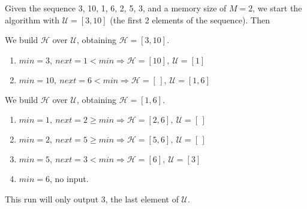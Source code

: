 Given the sequence 3, 10, 1, 6, 2, 5, 3, and a memory size of $M = 2$, we start
the algorithm with $\mathcal{U} = [3, 10]$ (the first 2 elements of the
sequence). Then
%
\begin{description}[labelindent=0.5cm]

  \item[Run 1.] We build $\mathcal{H}$ over $\mathcal{U}$, obtaining
  $\mathcal{H} = [3, 10]$.
  \begin{enumerate}

    \item $min = 3,\ next = 1 < min \Longrightarrow \mathcal{H} = [10],\
    \mathcal{U} = [1]$

    \item $min = 10,\ next = 6 < min \Longrightarrow \mathcal{H} = [\,],\
    \mathcal{U} = [1, 6]$

  \end{enumerate}

  \item[Run 2.] We build $\mathcal{H}$ over $\mathcal{U}$, obtaining
  $\mathcal{H} = [1, 6]$.
  \begin{enumerate}

    \item $min = 1,\ next = 2 \ge min \Longrightarrow \mathcal{H} = [2, 6],\
    \mathcal{U} = [\,]$

    \item $min = 2,\ next = 5 \ge min \Longrightarrow \mathcal{H} = [5, 6],\
    \mathcal{U} = [\,]$

    \item $min = 5,\ next = 3 < min \Longrightarrow \mathcal{H} = [6],\
    \mathcal{U} = [3]$

    \item $min = 6$, no input.

  \end{enumerate}

  \item[Run 3.] This run will only output 3, the last element of $\mathcal{U}$.

\end{description}
